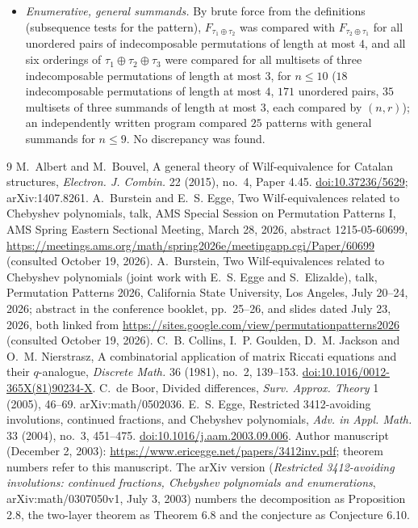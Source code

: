 \documentclass[11pt]{amsart}
\theoremstyle{definition}
\newcommand{\ds}{\oplus}
\begin{document}
\begin{itemize}
\item \emph{Enumerative, general summands.} By brute force from the definitions (subsequence tests for the pattern), $F_{\tau_1\ds\tau_2}$ was compared with $F_{\tau_2\ds\tau_1}$ for all unordered pairs of indecomposable permutations of length at most $4$, and all six orderings of $\tau_1\ds\tau_2\ds\tau_3$ were compared for all multisets of three indecomposable permutations of length at most $3$, for $n\le10$ ($18$ indecomposable permutations of length at most $4$, $171$ unordered pairs, $35$ multisets of three summands of length at most $3$, each compared by $(n,r)$); an independently written program compared $25$ patterns with general summands for $n\le9$. No discrepancy was found.
\end{itemize}

\begin{thebibliography}{9}
 M.~Albert and M.~Bouvel, A general theory of Wilf-equivalence for Catalan structures, \emph{Electron. J. Combin.} 22 (2015), no.~4, Paper 4.45. \href{https://doi.org/10.37236/5629}{doi:10.37236/5629}; arXiv:1407.8261.
 A.~Burstein and E.~S. Egge, Two Wilf-equivalences related to Chebyshev polynomials, talk, AMS Special Session on Permutation Patterns I, AMS Spring Eastern Sectional Meeting, March 28, 2026, abstract 1215-05-60699, \url{https://meetings.ams.org/math/spring2026e/meetingapp.cgi/Paper/60699} (consulted October 19, 2026).
 A.~Burstein, Two Wilf-equivalences related to Chebyshev polynomials (joint work with E.~S. Egge and S.~Elizalde), talk, Permutation Patterns 2026, California State University, Los Angeles, July 20--24, 2026; abstract in the conference booklet, pp.~25--26, and slides dated July 23, 2026, both linked from \url{https://sites.google.com/view/permutationpatterns2026} (consulted October 19, 2026).
 C.~B. Collins, I.~P. Goulden, D.~M. Jackson and O.~M. Nierstrasz, A combinatorial application of matrix Riccati equations and their $q$-analogue, \emph{Discrete Math.} 36 (1981), no.~2, 139--153. \href{https://doi.org/10.1016/0012-365X(81)90234-X}{doi:10.1016/0012-365X(81)90234-X}.
 C.~de Boor, Divided differences, \emph{Surv. Approx. Theory} 1 (2005), 46--69. arXiv:math/0502036.
 E.~S. Egge, Restricted 3412-avoiding involutions, continued fractions, and Chebyshev polynomials, \emph{Adv. in Appl. Math.} 33 (2004), no.~3, 451--475. \href{https://doi.org/10.1016/j.aam.2003.09.006}{doi:10.1016/j.aam.2003.09.006}. Author manuscript (December 2, 2003): \url{https://www.ericegge.net/papers/3412inv.pdf}; theorem numbers refer to this manuscript. The arXiv version (\emph{Restricted 3412-avoiding involutions: continued fractions, Chebyshev polynomials and enumerations}, arXiv:math/0307050v1, July 3, 2003) numbers the decomposition as Proposition 2.8, the two-layer theorem as Theorem 6.8 and the conjecture as Conjecture 6.10.

\end{thebibliography}
\end{document}
